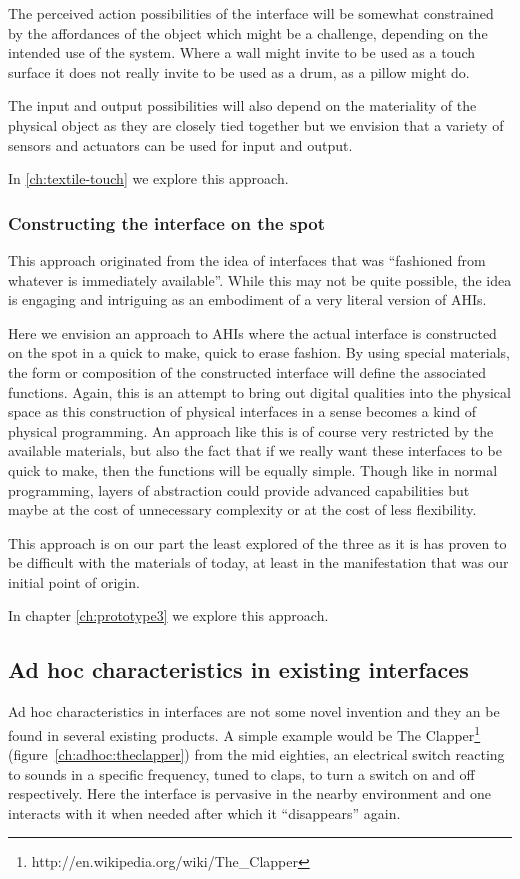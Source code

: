 The perceived action possibilities of the interface will be somewhat constrained by the affordances of the object which might be a challenge, depending on the intended use of the system.
Where a wall might invite to be used as a touch surface it does not really invite to be used as a drum, as a pillow might do.

The input and output possibilities will also depend on the materiality of the physical object as they are closely tied together but we envision that a variety of sensors and actuators can be used for input and output.

In \autoref{ch:textile-touch} we explore this approach.

\subsubsection{Constructing the interface on the spot}
This approach originated from the idea of interfaces that was ``fashioned from whatever is immediately available''.
While this may not be quite possible, the idea is engaging and intriguing as an embodiment of a very literal version of AHIs.

Here we envision an approach to AHIs where the actual interface is constructed on the spot in a quick to make, quick to erase fashion.
By using special materials, the form or composition of the constructed interface will define the associated functions.
Again, this is an attempt to bring out digital qualities into the physical space as this construction of physical interfaces in a sense becomes a kind of physical programming.
An approach like this is of course very restricted by the available materials, but also the fact that if we really want these interfaces to be quick to make, then the functions will be equally simple.
Though like in normal programming, layers of abstraction could provide advanced capabilities but maybe at the cost of unnecessary complexity or at the cost of less flexibility.

This approach is on our part the least explored of the three as it is has proven to be difficult with the materials of today, at least in the manifestation that was our initial point of origin. 

In chapter \ref{ch:prototype3} we explore this approach.

\subsection{Ad hoc characteristics in existing interfaces}
Ad hoc characteristics in interfaces are not some novel invention and they an be found in several existing products.
A simple example would be The Clapper\footnote{http://en.wikipedia.org/wiki/The\_Clapper} (figure~\ref{ch:adhoc:theclapper}) from the mid eighties, an electrical switch reacting to sounds in a specific frequency, tuned to claps, to turn a switch on and off respectively.
Here the interface is pervasive in the nearby environment and one interacts with it when needed after which it ``disappears'' again.


